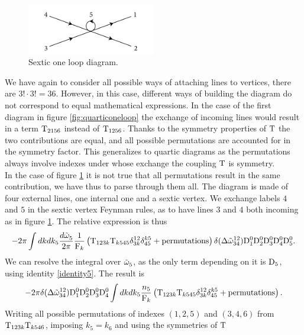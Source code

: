 \begin{figure}[ht]
    \centering
    \includegraphics[width=0.5\textwidth]{images/sexticdiagram.jpg}
    \caption{Sextic one loop diagram.}
    \label{fig:sexticoneloop}
\end{figure}
We have again to consider all possible ways of attaching lines to vertices, there are  $3!\cdot3! = 36$. However, in this case, different ways of building the diagram do not correspond to 
equal mathematical expressions. In the case of the first diagram in figure \ref{fig:quarticoneloop} the exchange of incoming lines would result in a term $\mathrm{T}_{2156}$
instead of $\mathrm{T}_{1256}$. Thanks to the symmetry properties of $\mathrm{T}$ the two contributions are equal, and all possible permutations are accounted for in the symmetry factor.
This generalizes to quartic diagrams as the permutations always involve indexes under whose exchange the coupling $\mathrm{T}$ is symmetry.\\ 
In the case of figure \ref{fig:sexticoneloop} it is not true that all permutations result in the same contribution, we have thus to parse through them all. The diagram 
is made of four external lines, one internal one and a sextic vertex. We exchange labels $4$ and $5$ in the sextic vertex Feynman rules, as to have lines $3$ and 
$4$ both incoming as in figure \ref{fig:sexticoneloop}. The relative expression is thus  
\begin{equation}
    -2\pi\int dk dk_5\frac{d\tilde{\omega}^{}_5}{2\pi} \frac{1}{\mathrm{F}_k}\left(\mathrm{T}_{123k}\mathrm{T}_{k545}\delta^{12}_{3k}
    \delta^{k5}_{45} + \text{permutations}\right)\delta(\Delta{\tilde{\omega}}^{12}_{34})
    \mathrm{D}_1^0\mathrm{D}_2^0\mathrm{D}_3^0\mathrm{D}_4^0\mathrm{D}_5^0.
\end{equation}
We can resolve the integral over $\tilde{\omega}^{}_5$, as the only term depending on it is $\mathrm{D}_5$, using identity \eqref{identity5}. The result is
\begin{equation}
    -2\pi \delta(\Delta{\tilde{\omega}}^{12}_{34})\mathrm{D}_1^0\mathrm{D}_2^0\mathrm{D}_3^0\mathrm{D}_4^0 \int dk dk_5
    \frac{n_5}{\mathrm{F}_k}\left(\mathrm{T}_{123k}\mathrm{T}_{k545}\delta^{12}_{3k}
    \delta^{k5}_{45} + \text{permutations}\right).
\end{equation}
Writing all possible permutations of indexes $(1,2,5)$ and $(3,4,6)$ from $\mathrm{T}_{123k}\mathrm{T}_{k546}$, imposing $k_5 = k_6$ and using the symmetries of $\mathrm{T}$ 
